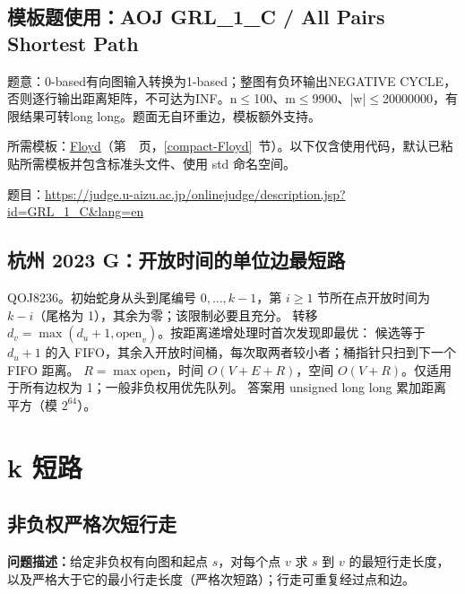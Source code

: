 

\newpage

\Needspace{510pt}

\subsection*{模板题使用：AOJ GRL\_1\_C / All Pairs Shortest Path}

\label{usage-example-304}

题意：0-based有向图输入转换为1-based；整图有负环输出NEGATIVE CYCLE，否则逐行输出距离矩阵，不可达为INF。n$\le$100、m$\le$9900、|w|$\le$20000000，有限结果可转long long。题面无自环重边，模板额外支持。

所需模板：\hyperref[compact-Floyd]{Floyd}（第~\pageref{compact-Floyd}~页，\ref{compact-Floyd}~节）。以下仅含使用代码，默认已粘贴所需模板并包含标准头文件、使用 std 命名空间。

题目：\url{https://judge.u-aizu.ac.jp/onlinejudge/description.jsp?id=GRL_1_C&lang=en}



\subsection{杭州 2023 G：开放时间的单位边最短路}\label{knowledge-hangzhou-g}
\label{app:hangzhou2023g}
QOJ8236。初始蛇身从头到尾编号 $0,\ldots,k-1$，第 $i\ge1$ 节所在点开放时间为 $k-i$（尾格为 1），其余为零；该限制必要且充分。
转移 $d_v=\max(d_u+1,\mathrm{open}_v)$。按距离递增处理时首次发现即最优：
候选等于 $d_u+1$ 的入 FIFO，其余入开放时间桶，每次取两者较小者；桶指针只扫到下一个 FIFO 距离。
$R=\max\mathrm{open}$，时间 $O(V+E+R)$，空间 $O(V+R)$。仅适用于所有边权为 1；一般非负权用优先队列。
答案用 unsigned long long 累加距离平方（模 $2^{64}$）。


\Needspace{180pt}

\section{k 短路}

\subsection{非负权严格次短行走}\label{compact-StrictSecondShortest}

\noindent\textbf{问题描述：}\allowbreak 给定非负权有向图和起点 $s$，对每个点 $v$ 求 $s$ 到 $v$ 的最短行走长度，以及严格大于它的最小行走长度（严格次短路）；行走可重复经过点和边。

